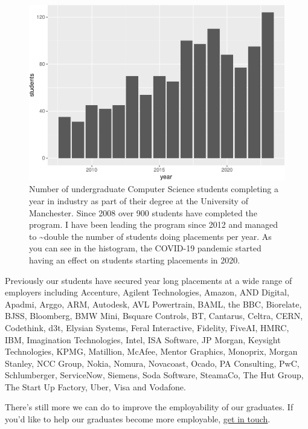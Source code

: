 \documentclass[
  12pt,
]{book}
\begin{document}
\begin{figure}

{\centering \includegraphics[width=1\linewidth]{duncan-hull_files/figure-latex/ie-fig-1} 

}

\caption{Number of undergraduate Computer Science students completing a year in industry as part of their degree at the University of Manchester. Since 2008 over 900 students have completed the program. I have been leading the program since 2012 and managed to \textasciitilde double the number of students doing placements per year. As you can see in the histogram, the COVID-19 pandemic started having an effect on students starting placements in 2020.}\label{fig:ie-fig}
\end{figure}



Previously our students have secured year long placements at a wide range of employers including Accenture, Agilent Technologies, Amazon, AND Digital, Apadmi, Arggo, ARM, Autodesk, AVL Powertrain, BAML, the BBC, Biorelate, BJSS, Bloomberg, BMW Mini, Bsquare Controls, BT, Cantarus, Celtra, CERN, Codethink, d3t, Elysian Systems, Feral Interactive, Fidelity, FiveAI, HMRC, IBM, Imagination Technologies, Intel, ISA Software, JP Morgan, Keysight Technologies, KPMG, Matillion, McAfee, Mentor Graphics, Monoprix, Morgan Stanley, NCC Group, Nokia, Nomura, Novacoast, Ocado, PA Consulting, PwC, Schlumberger, ServiceNow, Siemens, Soda Software, SteamaCo, The Hut Group, The Start Up Factory, Uber, Visa and Vodafone.

There's still more we can do to improve the employability of our graduates. If you'd like to help our graduates become more employable, \href{contact}{get in touch}.
\end{document}
